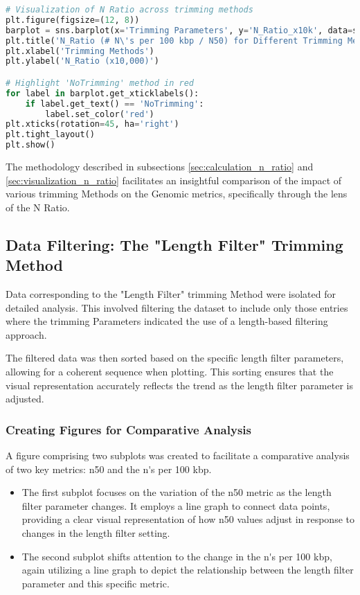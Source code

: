 \begin{lstlisting}[language=Python, label={lst:n_ratio_visual}, caption=Visualization of the "N Ratio"]
# Visualization of N Ratio across trimming methods
plt.figure(figsize=(12, 8))
barplot = sns.barplot(x='Trimming Parameters', y='N_Ratio_x10k', data=sorted_df)
plt.title('N_Ratio (# N\'s per 100 kbp / N50) for Different Trimming Methods (Values x10,000)')
plt.xlabel('Trimming Methods')
plt.ylabel('N_Ratio (x10,000)')

# Highlight 'NoTrimming' method in red
for label in barplot.get_xticklabels():
    if label.get_text() == 'NoTrimming':
        label.set_color('red')
plt.xticks(rotation=45, ha='right')
plt.tight_layout()
plt.show()
\end{lstlisting}


The methodology described in subsections \ref{sec:calculation_n_ratio} and \ref{sec:visualization_n_ratio} facilitates an insightful comparison of the impact of various \gls{trimming} Methods on the Genomic \gls{metrics}, specifically through the lens of the N Ratio.



\subsection{Data Filtering: The "Length Filter" Trimming Method} \label{sec:length_filter_trimming}
Data corresponding to the "Length Filter" \gls{trimming} Method were isolated for detailed analysis. This involved filtering the dataset to include only those entries where the \gls{trimming} Parameters indicated the use of a length-based filtering approach.

The filtered data was then sorted based on the specific length filter parameters, allowing for a coherent sequence when plotting. This sorting ensures that the visual representation accurately reflects the trend as the length filter parameter is adjusted.

\subsubsection{Creating Figures for Comparative Analysis}
A figure comprising two subplots was created to facilitate a comparative analysis of two key metrics: \gls{n50} and the \gls{n's per 100 kbp}. 

\begin{itemize}
    \item The first subplot focuses on the variation of the \gls{n50} metric as the length filter parameter changes. It employs a line graph to connect data points, providing a clear visual representation of how \gls{n50} values adjust in response to changes in the length filter setting.
    \item The second subplot shifts attention to the change in the \gls{n's per 100 kbp}, again utilizing a line graph to depict the relationship between the length filter parameter and this specific metric.
\end{itemize}


